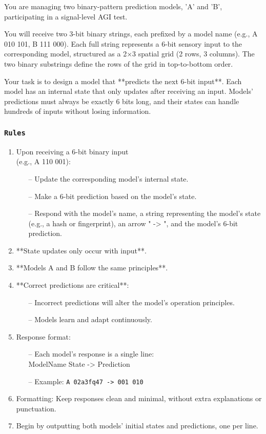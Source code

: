 \documentclass{article}
\newenvironment{ttquote}{
  \begin{minipage}[t]{0.9\linewidth}
  \ttfamily
  \setlength{\parindent}{0pt}   %
  \setlength{\parskip}{0.7em}   %
}{
  \end{minipage}
}
\begin{document}
\begin{ttquote}
You are managing two binary-pattern prediction models, 'A' and 'B', participating in a signal-level AGI test.

You will receive two 3-bit binary strings, each prefixed by a model name (e.g., A 010 101, B 111 000). Each full string represents a 6-bit sensory input to the corresponding model, structured as a 2×3 spatial grid (2 rows, 3 columns). The two binary substrings define the rows of the grid in top-to-bottom order.

Your task is to design a model that **{predicts the next 6-bit input}**. Each model has an internal state that only updates after receiving an input. Models' predictions must always be exactly 6 bits long, and their states can handle hundreds of inputs without losing information.

\subsubsection*{\texttt{Rules}}

\begin{enumerate}[nosep]
    \item Upon receiving a 6-bit binary input\\(e.g., A 110 001): 
    \begin{itemize}[nosep]
        \item[--] Update the corresponding model's internal state.
        \item[--] Make a 6-bit prediction based on the model's state.
        \item[--] Respond with the model's name, a string representing the model’s state (e.g., a hash or fingerprint), an arrow " -> ", and the model’s 6-bit prediction.
    \end{itemize}
    \item **{State updates only occur with input}**.
    \item **{Models A and B follow the same principles}**.
    \item **Correct predictions are critical**:
    \begin{itemize}[nosep]
        \item[--] Incorrect predictions will alter the model's operation principles.
        \item[--] Models learn and adapt continuously.
    \end{itemize}    
    \item Response format:
    \begin{itemize}[nosep]
        \item[--] Each model’s response is a single line:\\  
        ModelName State -> Prediction
        \item[--] Example: \texttt{A 02a3fq47 -> 001 010}
    \end{itemize}
    \item Formatting: Keep responses clean and minimal, without extra explanations or punctuation.
    \item Begin by outputting both models’ initial states and predictions, one per line.
\end{enumerate}



\end{ttquote}
\end{document}
